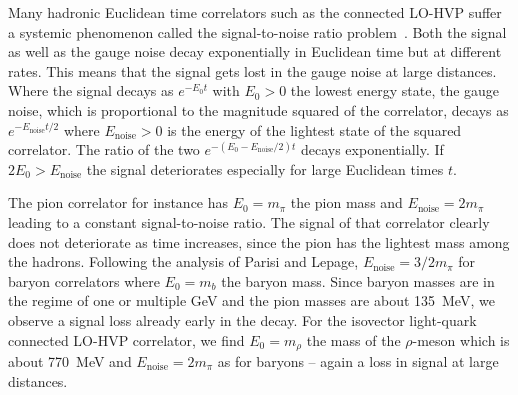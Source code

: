 Many hadronic Euclidean time correlators such as the connected LO-HVP suffer a systemic phenomenon called the signal-to-noise ratio problem~\cite{parisi1984,lepage1989}.
Both the signal as well as the gauge noise decay exponentially in Euclidean time but at different rates.
This means that the signal gets lost in the gauge noise at large distances.
Where the signal decays as $e^{-E_0 t}$ with $E_0 > 0$ the lowest energy state, the gauge noise, which is proportional to the magnitude squared of the correlator, decays as $e^{-E_{\text{noise}}t/2}$ where $E_{\text{noise}} > 0$ is the energy of the lightest state of the squared correlator.
The ratio of the two $e^{-(E_0 - E_{\text{noise}}/2)t}$ decays exponentially.
If $2E_0 > E_{\text{noise}}$ the signal deteriorates especially for large Euclidean times $t$.

The pion correlator for instance has $E_0 = m_{\pi}$ the pion mass and $E_{\text{noise}} = 2 m_{\pi}$ leading to a constant signal-to-noise ratio.
The signal of that correlator clearly does not deteriorate as time increases, since the pion has the lightest mass among the hadrons.
Following the analysis of Parisi and Lepage, $E_{\text{noise}} = 3/2 m_{\pi}$ for baryon correlators where $E_0 = m_{b}$ the baryon mass.
Since baryon masses are in the regime of one or multiple GeV and the pion masses are about \SI{135}{\mega \eV}, we observe a signal loss already early in the decay.
For the isovector light-quark connected LO-HVP correlator, we find $E_0 = m_{\rho}$ the mass of the $\rho$-meson which is about \SI{770}{\mega \eV} and $E_{\text{noise}} = 2 m_{\pi}$ as for baryons -- again a loss in signal at large distances.

